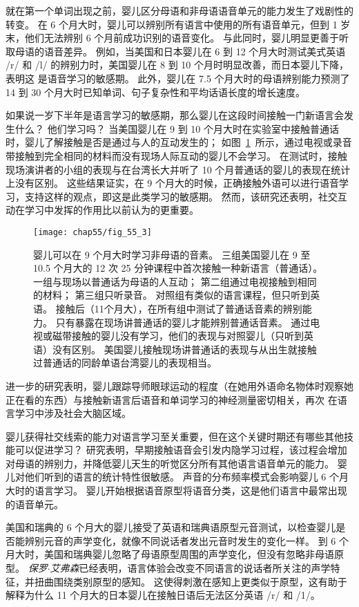就在第一个单词出现之前，婴儿区分母语和非母语语音单元的能力发生了戏剧性的转变。
在 6 个月大时，婴儿可以辨别所有语言中使用的所有语音单元，但到 1 岁末，他们无法辨别 6 个月前成功识别的语音变化。
与此同时，婴儿明显更善于听取母语的语音差异。
例如，当美国和日本婴儿在 6 到 12 个月大时测试美式英语 /r/ 和 /l/ 的辨别力时，美国婴儿在 8 到 10 个月时明显改善，而日本婴儿下降，表明这 是语音学习的敏感期。
此外，婴儿在 7.5 个月大时的母语辨别能力预测了 14 到 30 个月大时已知单词、句子复杂性和平均话语长度的增长速度。


如果说一岁下半年是语言学习的敏感期，那么婴儿在这段时间接触一门新语言会发生什么？
他们学习吗？
当美国婴儿在 9 到 10 个月大时在实验室中接触普通话时，婴儿了解接触是否是通过与人的互动发生的；
如图~\ref{fig:55_3}~所示，通过电视或录音带接触到完全相同的材料而没有现场人际互动的婴儿不会学习。
在测试时，接触现场演讲者的小组的表现与在台湾长大并听了 10 个月普通话的婴儿的表现在统计上没有区别。 这些结果证实，在 9 个月大的时候，正确接触外语可以进行语音学习，支持这样的观点，即这是此类学习的敏感期。
然而，该研究还表明，社交互动在学习中发挥的作用比以前认为的更重要。


\begin{figure}[htbp]
	\centering
	\texttt{[image: chap55/fig\_55\_3]}
	\caption{婴儿可以在 9 个月大时学习非母语的音素。
		三组美国婴儿在 9 至 10.5 个月大的 12 次 25 分钟课程中首次接触一种新语言（普通话）。
		一组与现场以普通话为母语的人互动；
		第二组通过电视接触到相同的材料；
		第三组只听录音。
		对照组有类似的语言课程，但只听到英语。
		接触后（11个月大），在所有组中测试了普通话音素的辨别能力\cite{kuhl2003foreign}。
		只有暴露在现场讲普通话的婴儿才能辨别普通话音素。
		通过电视或磁带接触的婴儿没有学习，他们的表现与对照婴儿（只听到英语）没有区别。
		美国婴儿接触现场讲普通话的表现与从出生就接触过普通话的同龄单语台湾婴儿的表现相当。}
	\label{fig:55_3}
\end{figure}


进一步的研究表明，婴儿跟踪导师眼球运动的程度（在她用外语命名物体时观察她正在看的东西）与接触新语言后语音和单词学习的神经测量密切相关，再次 在语言学习中涉及社会大脑区域。


婴儿获得社交线索的能力对语言学习至关重要，但在这个关键时期还有哪些其他技能可以促进学习？
研究表明，早期接触语音会引发内隐学习过程，该过程会增加对母语的辨别力，并降低婴儿天生的听觉区分所有其他语言语音单元的能力。
婴儿对他们听到的语言的统计特性很敏感。
声音的分布频率模式会影响婴儿 6 个月大时的语言学习。
婴儿开始根据语音原型将语音分类，这是他们语言中最常出现的语音单元。


美国和瑞典的 6 个月大的婴儿接受了英语和瑞典语原型元音测试，以检查婴儿是否能辨别元音的声学变化，就像不同说话者发出元音时发生的变化一样。
到 6 个月大时，美国和瑞典婴儿忽略了母语原型周围的声学变化，但没有忽略非母语原型。
\textit{保罗$\cdot$艾弗森}已经表明，语言体验会改变不同语言的说话者所关注的声学特征，并扭曲围绕类别原型的感知。
这使得刺激在感知上更类似于原型，这有助于解释为什么 11 个月大的日本婴儿在接触日语后无法区分英语 /r/ 和 /1/。



